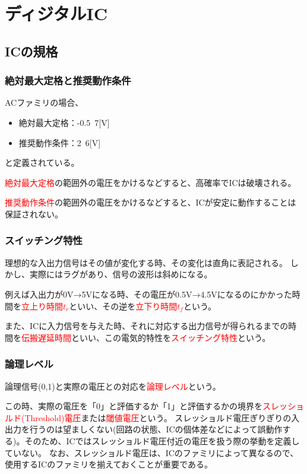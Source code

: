 \documentclass[12pt]{ltjsarticle}
\begin{document}
\newcommand{\red}[1]{\textcolor{red}{#1}}
\renewcommand{\labelenumi}{(\arabic{enumi})}

\section{ディジタルIC}
\subsection{ICの規格}
\subsubsection{絶対最大定格と推奨動作条件}
ACファミリの場合、
\begin{itemize}
\item 絶対最大定格：-0.5~7[V]
\item 推奨動作条件：2~6[V]
\end{itemize}
と定義されている。

\red{絶対最大定格}の範囲外の電圧をかけるなどすると、高確率でICは破壊される。

\red{推奨動作条件}の範囲外の電圧をかけるなどすると、ICが安定に動作することは保証されない。

\subsubsection{スイッチング特性}
理想的な入出力信号はその値が変化する時、その変化は直角に表記される。
しかし、実際にはラグがあり、信号の波形は斜めになる。

例えば入出力が0V→5Vになる時、その電圧が0.5V→4.5Vになるのにかかった時間を\red{立上り時間$t_r$}といい、その逆を\red{立下り時間$t_f$}という。

また、ICに入力信号を与えた時、それに対応する出力信号が得られるまでの時間を\red{伝搬遅延時間}といい、この電気的特性を\red{スイッチング特性}という。

\subsubsection{論理レベル}
論理信号(0,1)と実際の電圧との対応を\red{論理レベル}という。

この時、実際の電圧を「0」と評価するか「1」と評価するかの境界を\red{スレッショルド(Threshold)電圧}または\red{閾値電圧}という。
スレッショルド電圧ぎりぎりの入出力を行うのは望ましくない(回路の状態、ICの個体差などによって誤動作する)。そのため、ICではスレッショルド電圧付近の電圧を扱う際の挙動を定義していない。
なお、スレッショルド電圧は、ICのファミリによって異なるので、使用するICのファミリを揃えておくことが重要である。
\end{document}
